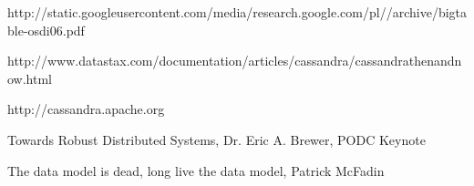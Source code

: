 \begin{thebibliography}{9}

http://static.googleusercontent.com/media/research.google.com/pl//archive/bigtable-osdi06.pdf

http://www.datastax.com/documentation/articles/cassandra/cassandrathenandnow.html

http://cassandra.apache.org

Towards Robust Distributed Systems, Dr. Eric A. Brewer, PODC Keynote

The data model is dead, long live the data model, Patrick McFadin

\end{thebibliography}